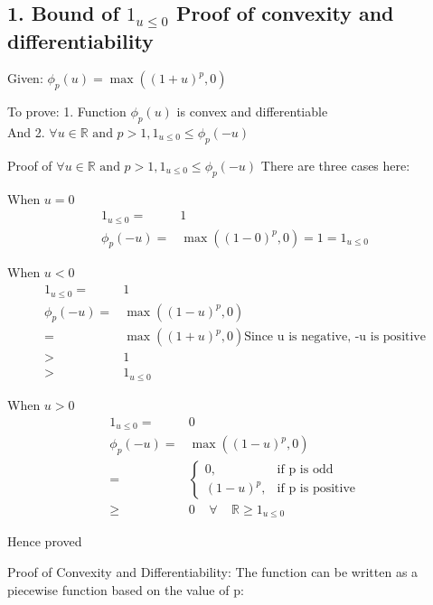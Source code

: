 \documentclass{article}
\begin{document}
\subsection*{1. Bound of \( 1_{u \le 0} \) Proof of convexity and differentiability}
\begin{description}
  \item{Given: } \( \phi_{p}(u) = \max( {(1 + u)}^{p}, 0) \)
  \item{To prove:} 1. Function \( \phi_{p}(u) \) is convex and differentiable \\ And 2. \( \forall u \in \mathbb{R} \textrm{ and } p > 1,  1_{u \le 0} \le \phi_{p}(-u) \)
  \item{Proof of \( \forall u \in \mathbb{R} \textrm{ and } p > 1,  1_{u \le 0} \le \phi_{p}(-u) \)}
    There are three cases here:
    
    When \( u = 0\)
    \begin{align*}
        1_{u \le 0} = &1 \\
        \phi_{p}(-u) = & \max( {(1 - 0)}^{p}, 0) = 1 = 1_{u \le 0}
    \end{align*}

    When \( u < 0\)
    \begin{align*}
        1_{u \le 0} = &1 \\
        \phi_{p}(-u) = & \max( {(1 - u)}^{p}, 0)  \\
        =& \max( {(1 + u)}^{p}, 0)  \textrm{Since u is negative, -u is positive} \\
        > & 1 \\
        > & 1_{u \le 0}
    \end{align*}

    When \( u > 0 \)
    \begin{align*}
        1_{u \le 0} = & 0 \\
        \phi_{p}(-u) = & \max( {(1 - u)}^{p}, 0)  \\
        = & 
        \begin{cases}
          0, & \textrm{if p is odd} \\
          {(1-u)}^p, & \textrm{if p is positive}
        \end{cases} \\
        \ge & 0 \;\;\;\; \forall \;\;\;\; \mathbb{R}
        \ge 1_{u \le 0}
    \end{align*}

    Hence proved
  \item{Proof of Convexity and Differentiability:}
    The function can be written as a piecewise function based on the value of p:


\end{description}
\end{document}
